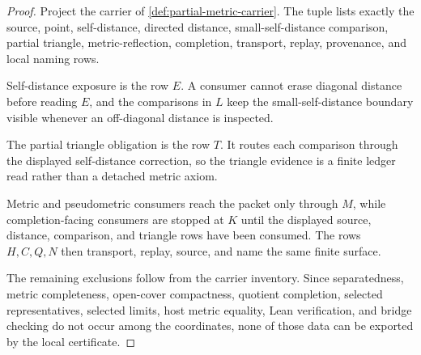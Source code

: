 \begin{proof}
Project the carrier of \autoref{def:partial-metric-carrier}. The tuple lists exactly the source, point, self-distance, directed distance, small-self-distance comparison, partial triangle, metric-reflection, completion, transport, replay, provenance, and local naming rows.

Self-distance exposure is the row $E$. A consumer cannot erase diagonal distance before reading $E$, and the comparisons in $L$ keep the small-self-distance boundary visible whenever an off-diagonal distance is inspected.

The partial triangle obligation is the row $T$. It routes each comparison through the displayed self-distance correction, so the triangle evidence is a finite ledger read rather than a detached metric axiom.

Metric and pseudometric consumers reach the packet only through $M$, while completion-facing consumers are stopped at $K$ until the displayed source, distance, comparison, and triangle rows have been consumed. The rows $H,C,Q,N$ then transport, replay, source, and name the same finite surface.

The remaining exclusions follow from the carrier inventory. Since separatedness, metric completeness, open-cover compactness, quotient completion, selected representatives, selected limits, host metric equality, Lean verification, and bridge checking do not occur among the coordinates, none of those data can be exported by the local certificate.
\end{proof}

